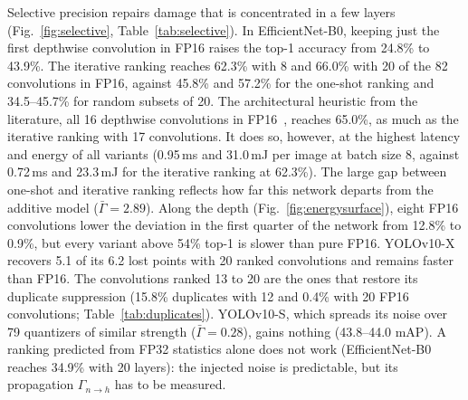 \documentclass[pdflatex,sn-mathphys-num]{sn-jnl}%
\theoremstyle{thmstyleone}%
\theoremstyle{thmstyletwo}%
\theoremstyle{thmstylethree}%
\begin{document}
Selective precision repairs damage that is concentrated in a few layers (Fig.~\ref{fig:selective}, Table~\ref{tab:selective}). In EfficientNet-B0, keeping just the first depthwise convolution in FP16 raises the top-1 accuracy from 24.8\% to 43.9\%. The iterative ranking reaches 62.3\% with 8 and 66.0\% with 20 of the 82 convolutions in FP16, against 45.8\% and 57.2\% for the one-shot ranking and 34.5--45.7\% for random subsets of 20. The architectural heuristic from the literature, all 16 depthwise convolutions in FP16~\cite{sheng2018quantization,nagel2019datafree}, reaches 65.0\%, as much as the iterative ranking with 17 convolutions. It does so, however, at the highest latency and energy of all variants (0.95\,ms and 31.0\,mJ per image at batch size 8, against 0.72\,ms and 23.3\,mJ for the iterative ranking at 62.3\%). The large gap between one-shot and iterative ranking reflects how far this network departs from the additive model ($\bar\Gamma=2.89$). Along the depth (Fig.~\ref{fig:energysurface}), eight FP16 convolutions lower the deviation in the first quarter of the network from 12.8\% to 0.9\%, but every variant above 54\% top-1 is slower than pure FP16. YOLOv10-X recovers 5.1 of its 6.2 lost points with 20 ranked convolutions and remains faster than FP16. The convolutions ranked 13 to 20 are the ones that restore its duplicate suppression (15.8\% duplicates with 12 and 0.4\% with 20 FP16 convolutions; Table~\ref{tab:duplicates}). YOLOv10-S, which spreads its noise over 79 quantizers of similar strength ($\bar\Gamma=0.28$), gains nothing (43.8--44.0 mAP). A ranking predicted from FP32 statistics alone does not work (EfficientNet-B0 reaches 34.9\% with 20 layers): the injected noise is predictable, but its propagation $\Gamma_{n\to h}$ has to be measured.

\end{document}
